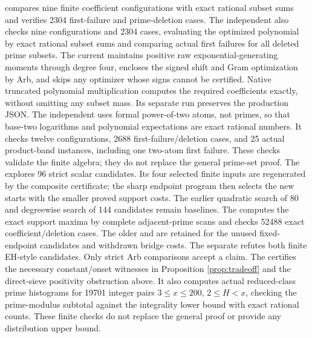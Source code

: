 \documentclass[11pt]{article}
\begin{document}
compares nine finite coefficient configurations with exact rational
subset sums and verifies 2304 first-failure and prime-deletion cases.
The independent 
also checks nine configurations and 2304 cases, evaluating the optimized
polynomial by exact rational subset sums and comparing actual first
failures for all deleted prime subsets.
The current 
maintains positive raw exponential-generating moments through degree four,
encloses the signed shift and Gram optimization by Arb, and skips any
optimizer whose signs cannot be certified. Native truncated polynomial
multiplication computes the required coefficients exactly, without omitting
any subset mass. Its separate run preserves the production JSON.
The independent 
uses formal power-of-two atoms, not primes, so that base-two logarithms
and polynomial expectations are exact rational numbers. It checks twelve
configurations, 2688 first-failure/deletion cases, and 25 actual product-band
instances, including one two-atom first failure. These checks validate the
finite algebra; they do not replace the general prime-set proof.
The  explores 96
strict scalar candidates. Its four selected finite inputs are regenerated
by the composite certificate; the sharp endpoint program then selects the
new starts with the smaller proved support costs. The earlier quadratic
search of 80 and degreewise search of 144 candidates remain baselines.
The 
computes the exact support maxima by complete adjacent-prime scans and
checks 52488 exact coefficient/deletion cases.
The older
 and
 are retained
for the unused fixed-endpoint candidates and withdrawn bridge costs.
The separate
 refutes both
finite EH-style candidates. Only strict Arb comparisons accept a claim.
The 
certifies the necessary constant/onset witnesses in Proposition
\ref{prop:tradeoff} and the direct-sieve positivity obstruction above.
It also computes actual reduced-class prime histograms for 19701
integer pairs $3\le x\le200$, $2\le H<x$, checking the prime-modulus
subtotal against the integrality lower bound with exact rational
counts. These finite checks do not replace the general proof or
provide any distribution upper bound.
\end{document}
